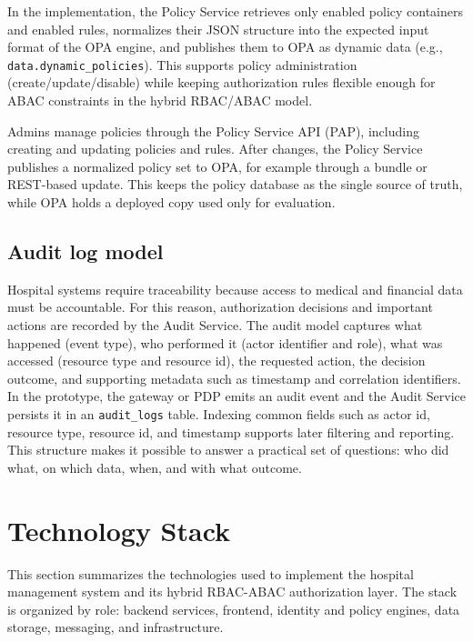 \vspace{0.5cm}

In the implementation, the Policy Service retrieves only enabled policy containers and enabled rules, normalizes their JSON structure into the expected input format of the OPA engine, and publishes them to OPA as dynamic data (e.g., \texttt{data.dynamic\_policies}). This supports policy administration (create/update/disable) while keeping authorization rules flexible enough for ABAC constraints in the hybrid RBAC/ABAC model.

\vspace{0.5cm}

Admins manage policies through the Policy Service API (PAP), including creating and updating policies and rules. After changes, the Policy Service publishes a normalized policy set to OPA, for example through a bundle or REST-based update. This keeps the policy database as the single source of truth, while OPA holds a deployed copy used only for evaluation.


\subsection{Audit log model}
\label{sec:audit-log-model}

Hospital systems require traceability because access to medical and financial data must be accountable. For this reason, authorization decisions and important actions are recorded by the Audit Service. The audit model captures what happened (event type), who performed it (actor identifier and role), what was accessed (resource type and resource id), the requested action, the decision outcome, and supporting metadata such as timestamp and correlation identifiers. In the prototype, the gateway or PDP emits an audit event and the Audit Service persists it in an \texttt{audit\_logs} table. Indexing common fields such as actor id, resource type, resource id, and timestamp supports later filtering and reporting. This structure makes it possible to answer a practical set of questions: who did what, on which data, when, and with what outcome.



\section{Technology Stack}
\label{sec:technology-stack}

This section summarizes the technologies used to implement the hospital management system and its hybrid RBAC-ABAC authorization layer. The stack is organized by role: backend services, frontend, identity and policy engines, data storage, messaging, and infrastructure.

